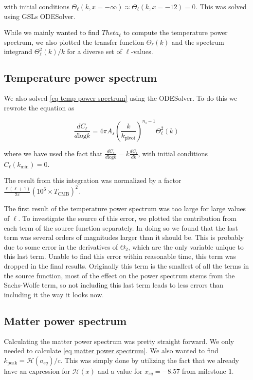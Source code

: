 \documentclass[12pt]{article}
\begin{document}
with initial conditions $\Theta_{\ell}(k, x=-\infty) \approx \Theta_{\ell}(k, x=-12) = 0$. This was solved using GSLs ODESolver.

While we mainly wanted to find $Theta_{\ell}$ to compute the temperature power spectrum, we also plotted the transfer function $\Theta_{\ell}(k)$ and the spectrum integrand $\Theta_{\ell}^2(k)/k$ for a diverse set of $\ell$-values.

\subsection{Temperature power spectrum}
We also solved \cref{eq temp power spectrum} using the ODESolver. To do this we rewrote the equation as

\begin{equation}
    \frac{dC_{\ell}}{d\mathrm{log}k}= 4\pi A_{s}\left(\frac{k}{k_{\mathrm{pivot}}}\right)^{n_{s}-1} \Theta_{\ell}^{2}(k) 
\end{equation}

where we have used the fact that $\frac{dC_{\ell}}{d\mathrm{log}k} = k\frac{dC_{\ell}}{dk}$, with initial conditions $C_{\ell}(k_{\mathrm{min}}) = 0$. 

The result from this integration was normalized by a factor $\frac{\ell(\ell + 1)}{2\pi}(10^6 \times T_{\mathrm{CMB}})^2.$

The first result of the temperature power spectrum was too large for large values of $\ell$. To investigate the source of this error, we plotted the contribution from each term of the source function separately. In doing so we found that the last term was several orders of magnitudes larger than it should be. This is probably due to some error in the derivatives of $\Theta_2$, which are the only variable unique to this last term. Unable to find this error within reasonable time, this term was dropped in the final results. Originally this term is the smallest of all the terms in the source function, most of the effect on the power spectrum stems from the Sachs-Wolfe term, so not including this last term leads to less errors than including it the way it looks now.

\subsection{Matter power spectrum}
Calculating the matter power spectrum was pretty straight forward. We only needed to calculate \cref{eq matter power spectrum}. We also wanted to find $k_{\mathrm{peak}} = \mathcal{H}(a_{eq})/c.$ This was simply done by utilizing the fact that we already have an expression for $\mathcal{H}(x)$ and a value for $x_{eq}=-8.57$ from milestone 1. 
\end{document}
